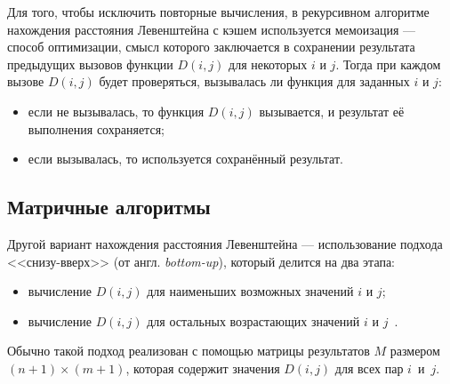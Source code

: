 Для того, чтобы исключить повторные вычисления, в рекурсивном алгоритме нахождения расстояния Левенштейна с кэшем используется мемоизация --- способ оптимизации, смысл которого заключается в сохранении результата предыдущих вызовов функции \(D(i, j)\) для некоторых \(i\) и \(j\). Тогда при каждом вызове \(D(i, j)\) будет проверяться, вызывалась ли функция для заданных \(i\) и \(j\):

\begin{itemize}
    \item если не вызывалась, то функция \(D(i, j)\) вызывается, и результат её выполнения сохраняется;
    \item если вызывалась, то используется сохранённый результат.
\end{itemize}

\subsection{Матричные алгоритмы}\label{sect:dyn_lev}

Другой вариант нахождения расстояния Левенштейна --- использование подхода <<снизу-вверх>> (от англ. \textit{bottom-up}), который делится на два этапа:

\begin{itemize}
    \item вычисление \(D(i, j)\) для наименьших возможных значений \(i\) и \(j\);
    \item вычисление \(D(i, j)\) для остальных возрастающих значений \(i\) и \(j\)~\cite{cambridge}.
\end{itemize}

Обычно такой подход реализован с помощью матрицы результатов \(M\) размером \((n + 1) \times (m + 1)\), которая содержит значения \(D(i, j)\) для всех пар \(i\)~и~\(j\).

